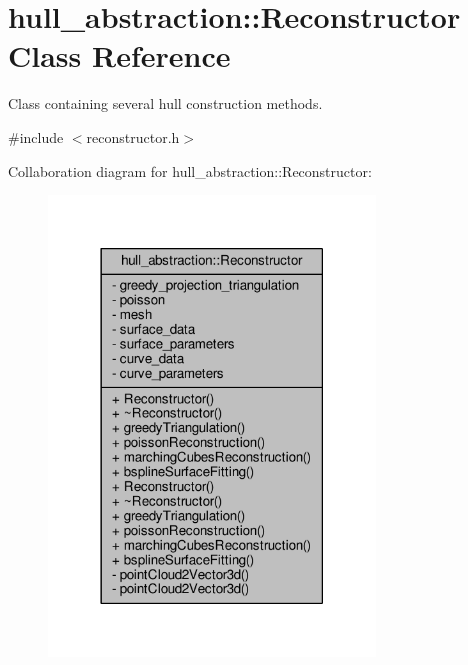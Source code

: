 \hypertarget{classhull__abstraction_1_1_reconstructor}{}\section{hull\+\_\+abstraction\+:\+:Reconstructor Class Reference}
\label{classhull__abstraction_1_1_reconstructor}


Class containing several hull construction methods.  




{\ttfamily \#include $<$reconstructor.\+h$>$}



Collaboration diagram for hull\+\_\+abstraction\+:\+:Reconstructor\+:\nopagebreak
\begin{figure}[H]
\begin{center}
\leavevmode
\includegraphics[width=246pt]{classhull__abstraction_1_1_reconstructor__coll__graph}
\end{center}
\end{figure}
